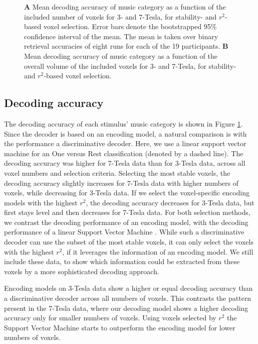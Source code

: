 \begin{figure}
  \centering
  \def\svgwidth{\linewidth}
  
	
  \caption{\textbf{A} Mean decoding accuracy of music category as a function of the included number of
  voxels for 3- and 7-Tesla, for stability- and $r^2$-based voxel selection. Error bars denote the bootstrapped 95\% confidence
  interval of the mean. The mean is taken over binary retrieval accuracies of
  eight runs for each of the 19 participants. \textbf{B} Mean decoding accuracy
  of music category as a function of the overall volume of the included voxels for 3- and 7-Tesla, for stability- and $r^2$-based voxel selection.}
 \label{fig:decoding_accuracy}
\end{figure}

\subsection*{Decoding accuracy}

The decoding accuracy of each stimulus' music category is shown in Figure
\ref{fig:decoding_accuracy}. Since the decoder is based on an encoding model, a
natural comparison is with the performance a discriminative decoder. Here, we
use a linear support vector machine for an One versus Rest classification
(denoted by a dashed line). The decoding accuracy was higher for 7-Tesla data
than for 3-Tesla data, across all voxel numbers and selection criteria.
Selecting the most stable voxels, the decoding accuracy slightly increases for
7-Tesla data with higher numbers of voxels, while decreasing for 3-Tesla data.
If we select the voxel-specific encoding models with the highest $r^2$, the
decoding accuracy decreases for 3-Tesla data, but first stays level and then
decreases for 7-Tesla data. For both selection methods, we contrast the decoding
performance of an encoding model, with the decoding performance of a linear Support
Vector Machine . While such a
discriminative decoder can use the subset of the most stable voxels, it can only
select the voxels with the highest $r^2$, if it leverages the information of an
encoding model. We still include these data, to show which information could be
extracted from these voxels by a more sophisticated decoding approach.

Encoding models on 3-Tesla data show a higher or equal decoding accuracy than a discriminative decoder across all numbers of
voxels. This contrasts the pattern present in the 7-Tesla data, where our
decoding model shows a higher decoding accuracy only for smaller numbers of
voxels. Using voxels selected by $r^2$ the Support Vector Machine starts to
outperform the encoding model for lower numbers of voxels.

